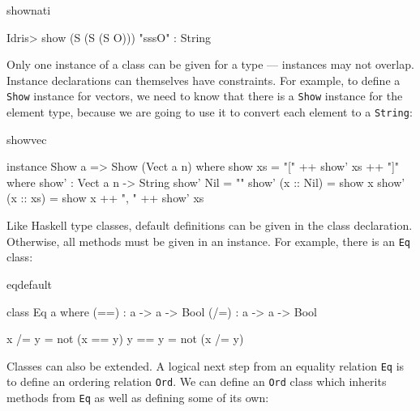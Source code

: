 \begin{SaveVerbatim}{shownati}

Idris> show (S (S (S O))) 
"sssO" : String

\end{SaveVerbatim}

\noindent
Only one instance of a class can be given for a type --- instances may not overlap.
Instance declarations can themselves have constraints. For example, to define a
\texttt{Show} instance for vectors, we need to know that there is a \texttt{Show} 
instance for the element type, because we are going to use it to convert each element
to a \texttt{String}:

\begin{SaveVerbatim}{showvec}

instance Show a => Show (Vect a n) where
    show xs = "[" ++ show' xs ++ "]" where
        show' : Vect a n -> String
        show' Nil        = ""
        show' (x :: Nil) = show x
        show' (x :: xs)  = show x ++ ", " ++ show' xs

\end{SaveVerbatim}


\noindent
Like Haskell type classes, default definitions can be given in the class declaration.
Otherwise, all methods must be given in an instance. For example, there is an
\texttt{Eq} class:

\begin{SaveVerbatim}{eqdefault}

class Eq a where
    (==) : a -> a -> Bool
    (/=) : a -> a -> Bool

    x /= y = not (x == y)
    y == y = not (x /= y)

\end{SaveVerbatim}

\noindent
Classes can also be extended. A logical next step from an equality relation \texttt{Eq}
is to define an ordering relation \texttt{Ord}. We can define an \texttt{Ord} class
which inherits methods from \texttt{Eq} as well as defining some of its own:

